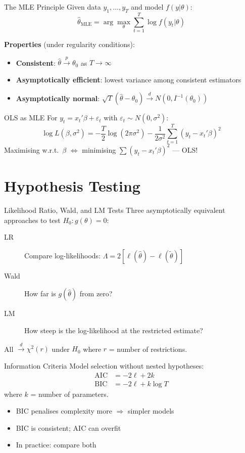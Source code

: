 \documentclass[aspectratio=169, 10pt]{beamer}
\begin{document}
\begin{frame}{The MLE Principle}
Given data $y_1, \ldots, y_T$ and model $f(y|\theta)$:
\[
\hat{\theta}_{\text{MLE}} = \arg\max_\theta \sum_{t=1}^{T} \log f(y_t | \theta)
\]

\textbf{Properties} (under regularity conditions):
\begin{itemize}
    \item \textbf{Consistent}: $\hat{\theta} \xrightarrow{p} \theta_0$ as $T \to \infty$
    \item \textbf{Asymptotically efficient}: lowest variance among consistent estimators
    \item \textbf{Asymptotically normal}: $\sqrt{T}(\hat{\theta} - \theta_0) \xrightarrow{d} N(0, I^{-1}(\theta_0))$
\end{itemize}
\end{frame}

\begin{frame}{OLS as MLE}
For $y_t = x_t'\beta + \varepsilon_t$ with $\varepsilon_t \sim N(0, \sigma^2)$:
\[
\log L(\beta, \sigma^2) = -\frac{T}{2}\log(2\pi\sigma^2) - \frac{1}{2\sigma^2}\sum_{t=1}^{T}(y_t - x_t'\beta)^2
\]
Maximising w.r.t.\ $\beta$ $\Leftrightarrow$ minimising $\sum(y_t - x_t'\beta)^2$ --- \alert{OLS}!
\end{frame}

\section{Hypothesis Testing}

\begin{frame}{Likelihood Ratio, Wald, and LM Tests}
Three asymptotically equivalent approaches to test $H_0: g(\theta) = 0$:
\begin{description}
    \item[LR] Compare log-likelihoods: $\Lambda = 2[\ell(\hat\theta) - \ell(\tilde\theta)]$
    \item[Wald] How far is $g(\hat\theta)$ from zero?
    \item[LM] How steep is the log-likelihood at the restricted estimate?
\end{description}

All $\xrightarrow{d} \chi^2(r)$ under $H_0$ where $r$ = number of restrictions.
\end{frame}

\begin{frame}{Information Criteria}
Model selection without nested hypotheses:
\begin{align}
\text{AIC} &= -2\ell + 2k \\
\text{BIC} &= -2\ell + k\log T
\end{align}
where $k$ = number of parameters.

\vspace{0.5em}
\begin{itemize}
    \item BIC penalises complexity more $\Rightarrow$ simpler models
    \item BIC is consistent; AIC can overfit
    \item In practice: compare both
\end{itemize}
\end{frame}
\end{document}

